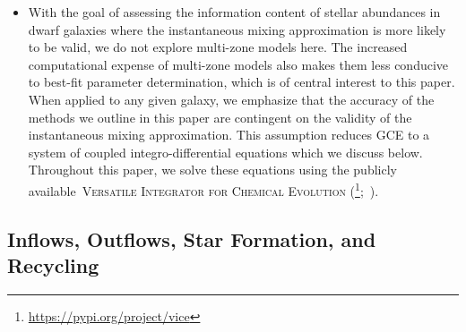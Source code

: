 \documentclass[ms.tex]{subfiles}
\begin{document}
\begin{itemize}
	\item With the goal of assessing the information content of stellar
	abundances in dwarf galaxies where the instantaneous mixing approximation
	is more likely to be valid, we do not explore multi-zone models here.
	The increased computational expense of multi-zone models also makes them
	less conducive to best-fit parameter determination, which is of central
	interest to this paper.
	When applied to any given galaxy, we emphasize that the accuracy of the
	methods we outline in this paper are contingent on the validity of the
	instantaneous mixing approximation.
	This assumption reduces GCE to a system of coupled integro-differential
	equations which we discuss below.
	Throughout this paper, we solve these equations using the publicly
	available~\textsc{Versatile Integrator for Chemical Evolution}
	(\vice\footnote{
		\url{https://pypi.org/project/vice}
	};~\citealp{Johnson2020}).

\end{itemize}

\subsection{Inflows, Outflows, Star Formation, and Recycling}
\label{sec:onezone:gas}
\end{document}
